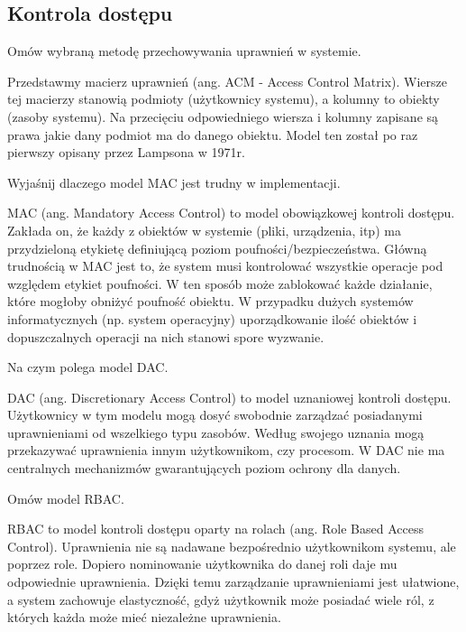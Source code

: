 \documentclass[answers,11pt]{exam}
\begin{document}
\subsection{Kontrola dostępu}
\begin{questions}

\question Omów wybraną metodę przechowywania uprawnień w systemie.
\begin{solution}
Przedstawmy macierz uprawnień (ang. ACM - Access Control Matrix). Wiersze tej macierzy stanowią podmioty (użytkownicy systemu), a kolumny to obiekty (zasoby systemu). Na przecięciu odpowiedniego wiersza i kolumny zapisane są prawa jakie dany podmiot ma do danego obiektu. Model ten został po raz pierwszy opisany przez Lampsona w 1971r.
\end{solution}

\question Wyjaśnij dlaczego model MAC jest trudny w implementacji.
\begin{solution}
MAC (ang. Mandatory Access Control) to model obowiązkowej kontroli dostępu. Zakłada on, że każdy z obiektów w systemie (pliki, urządzenia, itp) ma przydzieloną etykietę definiującą poziom poufności/bezpieczeństwa. Główną trudnością w MAC jest to, że system musi kontrolować wszystkie operacje pod względem etykiet poufności. W ten sposób może zablokować każde działanie, które mogłoby obniżyć poufność obiektu. W przypadku dużych systemów informatycznych (np. system operacyjny) uporządkowanie ilość obiektów i dopuszczalnych operacji na nich stanowi spore wyzwanie.
\end{solution}

\question Na czym polega model DAC.
\begin{solution}
DAC (ang. Discretionary Access Control) to model uznaniowej kontroli dostępu. Użytkownicy w tym modelu mogą dosyć swobodnie zarządzać posiadanymi uprawnieniami od wszelkiego typu zasobów. Według swojego uznania mogą przekazywać uprawnienia innym użytkownikom, czy procesom. W DAC nie ma centralnych mechanizmów gwarantujących poziom ochrony dla danych.
\end{solution}

\question Omów model RBAC.
\begin{solution}
RBAC to model kontroli dostępu oparty na rolach (ang. Role Based Access Control). Uprawnienia nie są nadawane bezpośrednio użytkownikom systemu, ale poprzez role. Dopiero nominowanie użytkownika do danej roli daje mu odpowiednie uprawnienia. Dzięki temu zarządzanie uprawnieniami jest ułatwione, a system zachowuje elastyczność, gdyż użytkownik może posiadać wiele ról, z których każda może mieć niezależne uprawnienia. 
\end{solution}


\end{questions}
\end{document}
